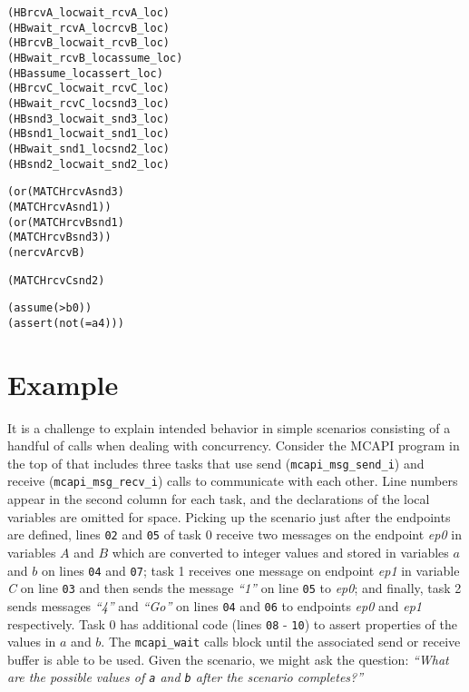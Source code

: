 \newsavebox{\boxSMT}
\begin{lrbox}{\boxSMT}
\begin{minipage}[c]{0.4\linewidth}
\begin{alltt}
(HB rcvA_loc wait_rcvA_loc)
(HB wait_rcvA_loc rcvB_loc)
(HB rcvB_loc wait_rcvB_loc)
(HB wait_rcvB_loc assume_loc)
(HB assume_loc assert_loc)
(HB rcvC_loc wait_rcvC_loc)
(HB wait_rcvC_loc snd3_loc)
(HB snd3_loc wait_snd3_loc)
(HB snd1_loc wait_snd1_loc)
(HB wait_snd1_loc snd2_loc)
(HB snd2_loc wait_snd2_loc)

(or (MATCH rcvA snd3)
    (MATCH rcvA snd1))
(or (MATCH rcvB  snd1)
    (MATCH rcvB snd3))
(ne rcvA rcvB)

(MATCH rcvC snd2)

(assume (> b 0))
(assert (not (= a 4)))
\end{alltt}
\end{minipage}
\end{lrbox}

\section{Example}

It is a challenge to explain intended behavior in simple scenarios
consisting of a handful of calls when dealing with concurrency. Consider
the MCAPI program in the top of  that includes three
tasks that use send (\texttt{mcapi\_msg\_send\_i}) and receive
(\texttt{mcapi\_msg\_recv\_i}) calls to communicate with each other.
Line numbers appear in the second column for each task, and the
declarations of the local variables are omitted for space. Picking up
the scenario just after the endpoints are defined, lines \texttt{02}
and \texttt{05} of task 0 receive two messages on the endpoint
\textit{ep0} in variables $A$ and $B$ which are
converted to integer values and stored in variables $a$ and
$b$ on lines \texttt{04} and \texttt{07}; task 1 receives one
message on endpoint \textit{ep1} in variable \textit{C} on line
\texttt{03} and then sends the message \textit{``1''} on line \texttt{05} to
\textit{ep0}; and finally, task 2 sends messages \textit{``4''} and \textit{``Go''} on
lines \texttt{04} and \texttt{06} to endpoints \textit{ep0} and
\textit{ep1} respectively. Task 0 has additional code (lines \texttt{08} -
\texttt{10}) to assert properties of the values in $a$ and
$b$. The \texttt{mcapi\_wait} calls block until the associated
send or receive buffer is able to be used. Given the scenario, we
might ask the question: \emph{``What are the possible values of
\texttt{a} and \texttt{b} after the scenario completes?''}

